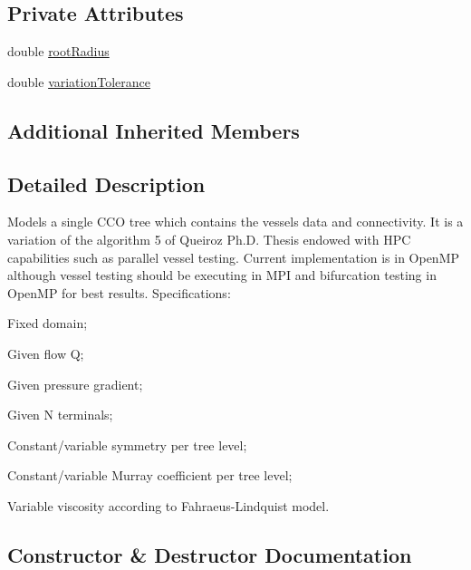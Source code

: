 \subsection*{Private Attributes}
\begin{DoxyCompactItemize}
\item 
double \hyperlink{class_f_r_r_variable_viscosity_c_c_o_s_tree_a15338c59c6dbecaeaeab80577a22c877}{root\+Radius}
\item 
double \hyperlink{class_f_r_r_variable_viscosity_c_c_o_s_tree_a8cea4a5abcffd37cb053fce38cee03cf}{variation\+Tolerance}
\end{DoxyCompactItemize}
\subsection*{Additional Inherited Members}


\subsection{Detailed Description}
Models a single C\+CO tree which contains the vessel\textquotesingle{}s data and connectivity. It is a variation of the algorithm 5 of Queiroz Ph.\+D. Thesis endowed with H\+PC capabilities such as parallel vessel testing. Current implementation is in Open\+MP although vessel testing should be executing in M\+PI and bifurcation testing in Open\+MP for best results. Specifications\+:
\begin{DoxyItemize}
\item Fixed domain;
\item Given flow Q;
\item Given pressure gradient;
\item Given N terminals;
\item Constant/variable symmetry per tree level;
\item Constant/variable Murray coefficient per tree level;
\item Variable viscosity according to Fahraeus-\/\+Lindquist model. 
\end{DoxyItemize}

\subsection{Constructor \& Destructor Documentation}
